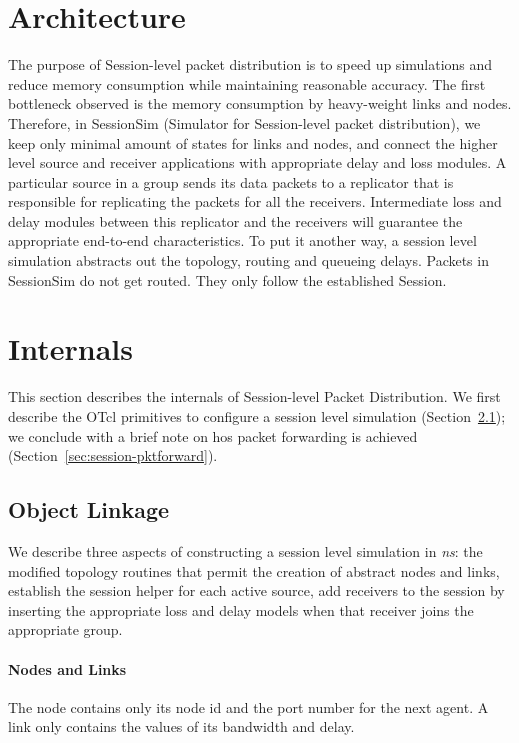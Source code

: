 \section{Architecture}
\label{sec:session-arch}
The purpose of Session-level packet distribution is to
speed up simulations and reduce memory consumption while 
maintaining reasonable accuracy.
The first bottleneck observed is the memory consumption by heavy-weight
links and nodes.  Therefore, in SessionSim (Simulator for Session-level
packet distribution), we keep only minimal amount of 
states for links and nodes, and connect the higher level source and 
receiver applications with appropriate delay and loss modules.
A particular source in a group sends its data packets
to a replicator that is responsible for replicating the packets
for all the receivers.
Intermediate loss and delay modules between this replicator and the receivers
will guarantee the appropriate end-to-end characteristics.
To put it another way, a session level simulation
abstracts out the topology, routing and queueing delays.
Packets in SessionSim do not get routed.  
They only follow the established Session.

\section{Internals}
This section describes the internals of Session-level Packet Distribution.
We first describe the OTcl primitives to configure a session level
simulation (Section~\ref{sec:session-objlink});
we conclude with a brief note on hos packet forwarding is achieved
(Section~\ref{sec:session-pktforward}).

\subsection{Object Linkage}
\label{sec:session-objlink}

We describe three aspects of constructing a session level simulation in
\emph{ns}:
the modified topology routines that permit the creation of abstract
nodes and links,
establish the session helper for each active source,
add receivers to the session by inserting the appropriate loss and delay
models when that receiver joins the appropriate group.

\paragraph{Nodes and Links}
The node contains only its node id and the port number for the next agent.
A link only contains the values of its bandwidth and delay.

